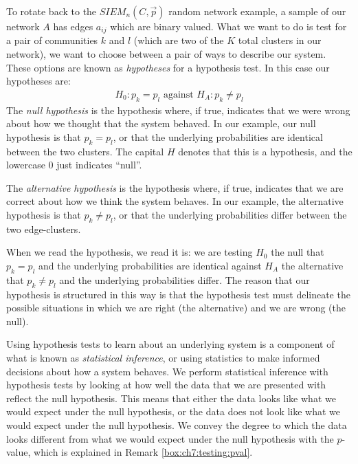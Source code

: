 To rotate back to the $SIEM_n(C, \vec p)$ random network example, a sample of our network $A$ has edges $a_{ij}$ which are binary valued. What we want to do is test for a pair of communities $k$ and $l$ (which are two of the $K$ total clusters in our network), we want to choose between a pair of ways to describe our system. These options are known as \textit{hypotheses} for a hypothesis test. In this case our hypotheses are:
\begin{align*}
    H_0 : p_k = p_l \text{ against }H_A : p_k \neq p_l
\end{align*}
The \textit{null hypothesis} is the hypothesis where, if true, indicates that we were wrong about how we thought that the system behaved. In our example, our null hypothesis is that $p_k = p_l$, or that the underlying probabilities are identical between the two clusters. The capital $H$ denotes that this is a hypothesis, and the lowercase $0$ just indicates ``null''.

The \textit{alternative hypothesis} is the hypothesis where, if true, indicates that we are correct about how we think the system behaves. In our example, the alternative hypothesis is that $p_k \neq p_l$, or that the underlying probabilities differ between the two edge-clusters. 

When we read the hypothesis, we read it is: we are testing $H_0$ the null that $p_k = p_l$ and the underlying probabilities are identical against $H_A$ the alternative that $p_k \neq p_l$ and the underlying probabilities differ. The reason that our hypothesis is structured in this way is that the hypothesis test must delineate the possible situations in which we are right (the alternative) and we are wrong (the null). 

Using hypothesis tests to learn about an underlying system is a component of what is known as \textit{statistical inference}, or using statistics to make informed decisions about how a system behaves. We perform statistical inference with hypothesis tests by looking at how well the data that we are presented with reflect the null hypothesis. This means that either the data looks like what we would expect under the null hypothesis, or the data does not look like what we would expect under the null hypothesis. We convey the degree to which the data looks different from what we would expect under the null hypothesis with the $p$-value, which is explained in Remark \ref{box:ch7:testing:pval}.

